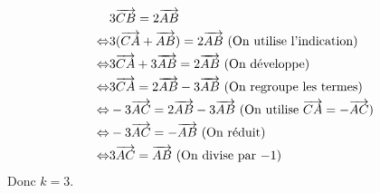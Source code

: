 \documentclass{controle}
\begin{document}
\begin{questions}
\begin{solution}
\begin{parts}
\begin{subparts}
\subpart
\begin{equation*}
\begin{aligned}
&3\overrightarrow{CB}=2\overrightarrow{AB}\\
\Leftrightarrow&3(\overrightarrow{CA} + \overrightarrow{AB})=2\overrightarrow{AB}\text{ (On utilise l'indication)}\\
\Leftrightarrow&3\overrightarrow{CA} + 3\overrightarrow{AB}=2\overrightarrow{AB}\text{ (On développe)}\\
\Leftrightarrow&3\overrightarrow{CA}=2\overrightarrow{AB} - 3\overrightarrow{AB}\text{ (On regroupe les termes)}\\
\Leftrightarrow&-3\overrightarrow{AC}=2\overrightarrow{AB} - 3\overrightarrow{AB}\text{ (On utilise $\overrightarrow{CA} = -\overrightarrow{AC}$)}\\
\Leftrightarrow&-3\overrightarrow{AC}=-\overrightarrow{AB}\text{ (On réduit)}\\
\Leftrightarrow&3\overrightarrow{AC}=\overrightarrow{AB}\text{ (On divise par $-1$)}\\
\end{aligned}
\end{equation*}
Donc $k = 3$.
\end{subparts}
\end{parts}
\end{solution}





\end{questions}
\end{document}
